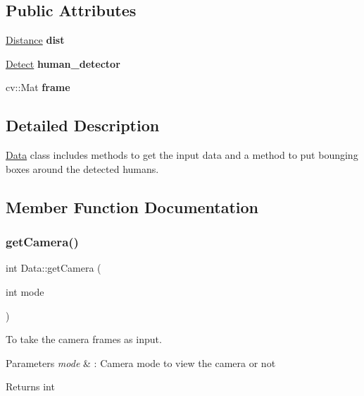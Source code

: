 \subsection*{Public Attributes}
\begin{DoxyCompactItemize}
\item 
\mbox{\label{classData_ae089cb20a02909129d8f055805d38f8e}} 
\hyperlink{classDistance}{Distance} {\bfseries dist}
\item 
\mbox{\label{classData_aa4b6fa81e2c1055e4a193bef4fd1b03c}} 
\hyperlink{classDetect}{Detect} {\bfseries human\+\_\+detector}
\item 
\mbox{\label{classData_aba335c8ce9ac25fe621238c4c5d9acdb}} 
cv\+::\+Mat {\bfseries frame}
\end{DoxyCompactItemize}


\subsection{Detailed Description}
\hyperlink{classData}{Data} class includes methods to get the input data and a method to put bounging boxes around the detected humans. 

\subsection{Member Function Documentation}
\mbox{\label{classData_a511184f11597e720b0bf96b9b4f89a0b}} 
\subsubsection{\texorpdfstring{get\+Camera()}{getCamera()}}
{\footnotesize\ttfamily int Data\+::get\+Camera (\begin{DoxyParamCaption}\item[{int}]{mode }\end{DoxyParamCaption})}



To take the camera frames as input. 


\begin{DoxyParams}{Parameters}
{\em mode} & \+: Camera mode to view the camera or not \\
\hline
\end{DoxyParams}
\begin{DoxyReturn}{Returns}
int 
\end{DoxyReturn}
\mbox{\label{classData_a9875eec4b1ee3fc18512e5721513d34e}} 
